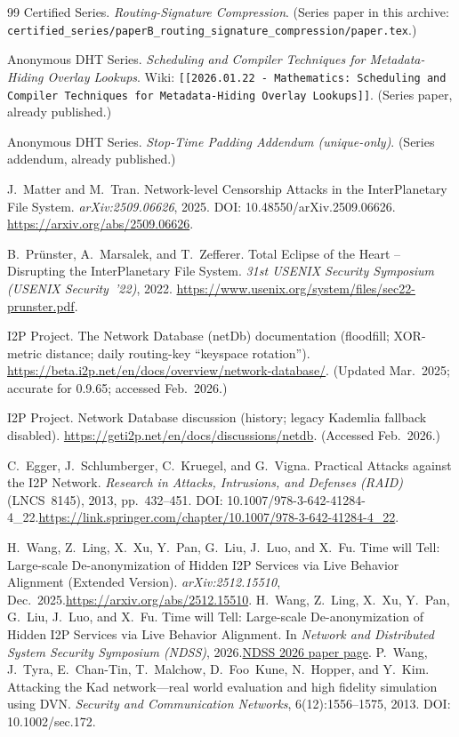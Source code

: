 \documentclass[11pt]{article}
\begin{document}
\begin{thebibliography}{99}
Certified Series.
\emph{Routing-Signature Compression}.
(Series paper in this archive: \texttt{certified\_series/paperB\_routing\_signature\_compression/paper.tex}.)

Anonymous DHT Series.
\emph{Scheduling and Compiler Techniques for Metadata-Hiding Overlay Lookups}.
Wiki: \texttt{[[2026.01.22 - Mathematics: Scheduling and Compiler Techniques for Metadata-Hiding Overlay Lookups]]}.
(Series paper, already published.)

Anonymous DHT Series.
\emph{Stop-Time Padding Addendum (unique-only)}.
(Series addendum, already published.)

J.~Matter and M.~Tran.
Network-level Censorship Attacks in the InterPlanetary File System.
\emph{arXiv:2509.06626}, 2025. DOI: 10.48550/arXiv.2509.06626.
\url{https://arxiv.org/abs/2509.06626}.

B.~Pr\"unster, A.~Marsalek, and T.~Zefferer.
Total Eclipse of the Heart -- Disrupting the InterPlanetary File System.
\emph{31st USENIX Security Symposium (USENIX Security~'22)}, 2022.
\url{https://www.usenix.org/system/files/sec22-prunster.pdf}.

I2P Project.
The Network Database (netDb) documentation (floodfill; XOR-metric distance; daily routing-key ``keyspace rotation'').
\url{https://beta.i2p.net/en/docs/overview/network-database/}.
(Updated Mar.~2025; accurate for 0.9.65; accessed Feb.~2026.)

I2P Project.
Network Database discussion (history; legacy Kademlia fallback disabled).
\url{https://geti2p.net/en/docs/discussions/netdb}.
(Accessed Feb.~2026.)

C.~Egger, J.~Schlumberger, C.~Kruegel, and G.~Vigna.
Practical Attacks against the I2P Network.
\emph{Research in Attacks, Intrusions, and Defenses (RAID)} (LNCS~8145), 2013, pp.~432--451.
DOI: 10.1007/978-3-642-41284-4\_22.\;\url{https://link.springer.com/chapter/10.1007/978-3-642-41284-4_22}.

H.~Wang, Z.~Ling, X.~Xu, Y.~Pan, G.~Liu, J.~Luo, and X.~Fu.
\newblock Time will Tell: Large-scale De-anonymization of Hidden I2P Services via Live Behavior Alignment (Extended Version).
\newblock \emph{arXiv:2512.15510}, Dec.\ 2025.\;\url{https://arxiv.org/abs/2512.15510}.
H.~Wang, Z.~Ling, X.~Xu, Y.~Pan, G.~Liu, J.~Luo, and X.~Fu.
\newblock Time will Tell: Large-scale De-anonymization of Hidden I2P Services via Live Behavior Alignment.
\newblock In \emph{Network and Distributed System Security Symposium (NDSS)}, 2026.\;\href{https://www.ndss-symposium.org/ndss-paper/time-will-tell-large-scale-de-anonymization-of-hidden-i2p-services-via-live-behavior-alignment/}{NDSS 2026 paper page}.
P.~Wang, J.~Tyra, E.~Chan-Tin, T.~Malchow, D.~Foo~Kune, N.~Hopper, and Y.~Kim.
Attacking the Kad network---real world evaluation and high fidelity simulation using DVN.
\emph{Security and Communication Networks}, 6(12):1556--1575, 2013.
DOI: 10.1002/sec.172.



\end{thebibliography}
\end{document}
